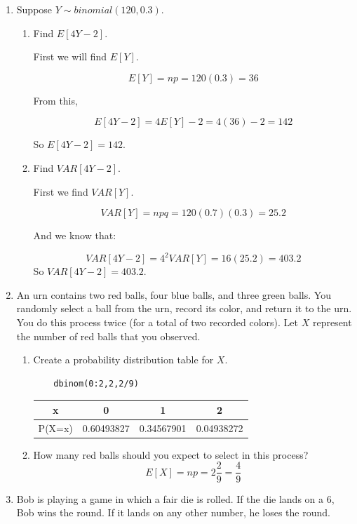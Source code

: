 \documentclass{article}
\begin{document}
\begin{enumerate}
\item Suppose $Y\sim binomial(120,0.3)$.
\begin{enumerate}[label= (\alph*)] 
\item Find $E[4Y-2]$.

First we will find $E[Y]$.

\[E[Y]=np=120(0.3)=36\]

From this,

\[E[4Y-2]=4E[Y]-2=4(36)-2=142\]

So $E[4Y-2]=142$.

\item Find $VAR[4Y-2]$.

First we find $VAR[Y]$.

\[VAR[Y]=npq=120(0.7)(0.3)=25.2\]

And we know that:

\[VAR[4Y-2]=4^2 VAR[Y]=16(25.2)=403.2
\]
So $VAR[4Y-2]=403.2$.

\end{enumerate}

\item An urn contains two red balls, four blue balls, and three green balls. You randomly
select a ball from the urn, record its color, and return it to the urn. You do this process
twice (for a total of two recorded colors). Let $X$ represent the number of red balls that
you observed.
\begin{enumerate}[label= (\alph*)] 
 
\item Create a probability distribution table for $X$.
\begin{verbatim}
    dbinom(0:2,2,2/9)
\end{verbatim}
\begin{center}
    \begin{tabular}{|c|c|c|c|}
        \hline
        x&0&1&2\\
        \hline
        P(X=x)&0.60493827& 0.34567901& 0.04938272\\
        \hline
    \end{tabular}
\end{center}
\item How many red balls should you expect to select in this process?
\[E[X]=np=2\frac{2}{9}=\frac{4}{9}\]
\end{enumerate}
\item Bob is playing a game in which a fair die is rolled. If the die lands on a 6, Bob wins the
round. If it lands on any other number, he loses the round.
\begin{enumerate}[label= (\alph*)] 
 

\end{enumerate}
\end{enumerate}
\end{document}
